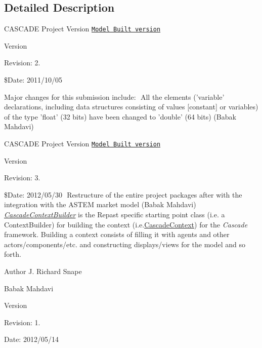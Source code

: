 \subsection{Detailed Description}
C\-A\-S\-C\-A\-D\-E Project Version \href{Version# for the entire project/ as whole}{\tt Model Built version} 

\begin{DoxyVersion}{Version}

\end{DoxyVersion}
\begin{DoxyParagraph}{Revision\-:}
2. 
\end{DoxyParagraph}
\$\-Date\-: 2011/10/05

Major changes for this submission include\-:  All the elements ('variable' declarations, including data structures consisting of values \mbox{[}constant\mbox{]} or variables) of the type 'float' (32 bits) have been changed to 'double' (64 bits) (Babak Mahdavi)

C\-A\-S\-C\-A\-D\-E Project Version \href{Version# for the entire project/ as whole}{\tt Model Built version} \begin{DoxyVersion}{Version}

\end{DoxyVersion}
\begin{DoxyParagraph}{Revision\-:}
3. 
\end{DoxyParagraph}
\$\-Date\-: 2012/05/30  Restructure of the entire project packages after with the integration with the A\-S\-T\-E\-M market model (Babak Mahdavi) {\itshape \hyperlink{classuk_1_1ac_1_1dmu_1_1iesd_1_1cascade_1_1context_1_1_cascade_context_builder}{Cascade\-Context\-Builder}} is the Repast specific starting point class (i.\-e. a {\ttfamily Context\-Builder}) for building the context (i.\-e.\hyperlink{classuk_1_1ac_1_1dmu_1_1iesd_1_1cascade_1_1context_1_1_cascade_context}{Cascade\-Context}) for the {\itshape Cascade} framework. Building a context consists of filling it with agents and other actors/components/etc. and constructing displays/views for the model and so forth.

\begin{DoxyAuthor}{Author}
J. Richard Snape 

Babak Mahdavi 
\end{DoxyAuthor}
\begin{DoxyVersion}{Version}

\end{DoxyVersion}
\begin{DoxyParagraph}{Revision\-:}
1. 
\end{DoxyParagraph}
\begin{DoxyParagraph}{Date\-:}
2012/05/14 
\end{DoxyParagraph}


